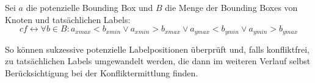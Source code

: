 Sei $a$ die potenzielle Bounding Box und $B$ die Menge der Bounding Boxes von Knoten und tatsächlichen Labels:
$$ cf \leftrightarrow \forall b \in B: a_{xmax} < b_{xmin} \vee a_{xmin} > b_{xmax} \vee a_{ymax} < b_{ymin} \vee a_{ymin} > b_{ymax} $$

So können sukzessive potenzielle Labelpositionen überprüft und, falls konfliktfrei, zu tatsächlichen Labels umgewandelt werden,
die dann im weiteren Verlauf selbst Berücksichtigung bei der Konfliktermittlung finden.